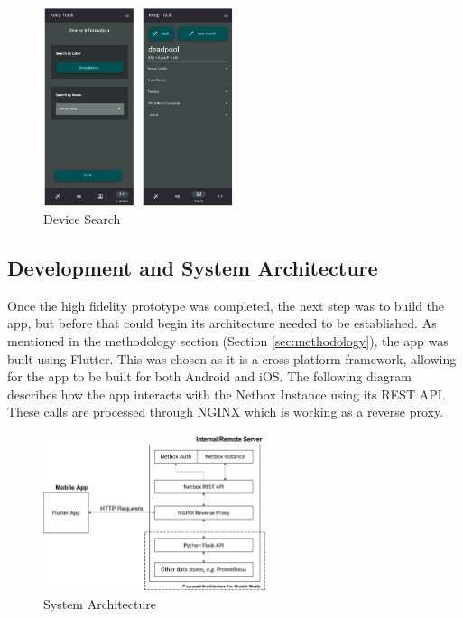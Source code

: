 \documentclass [11pt,a4paper]{article}
\begin{document}
\begin{figure}[H]
    \centering
    \includegraphics[width=0.5\textwidth]{images/device_info.png}
    \caption{Device Search}
    \label{fig:device_search}
\end{figure}

\subsection{Development and System Architecture}
\label{sec:development} 
Once the high fidelity prototype was completed, the next step was to build the app, but before that could begin its architecture needed to be established. As mentioned in the methodology section (Section \ref{sec:methodology}), the app was built using Flutter. This was chosen as it is a cross-platform framework, allowing for the app to be built for both Android and iOS. The following diagram describes how the app interacts with the Netbox Instance using its REST API. These calls are processed through NGINX which is working as a reverse proxy.

\begin{figure}[H]
    \centering
    \includegraphics[width=0.6\textwidth]{images/top-level-archi.png}
    \caption{System Architecture}
    \label{fig:architecture}
\end{figure}
\end{document}
